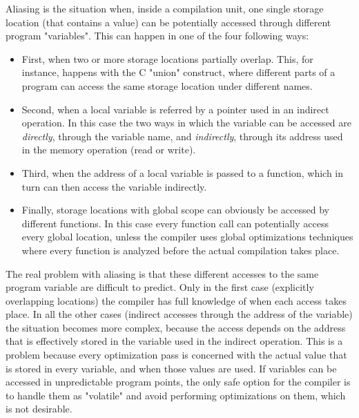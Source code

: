 Aliasing is the situation when, inside a compilation unit, one single storage location (that contains a value) can be potentially accessed through different program "variables".
This can happen in one of the four following ways:
\begin{itemize}
\item First, when two or more storage locations partially overlap. This, for instance, happens with the C "union" construct, where different parts of a program can access the same storage location under different names.
\item Second, when a local variable is referred by a pointer used in an indirect operation. In this case the two ways in which the variable can be accessed are {\em directly}, through the variable name, and {\em indirectly}, through its address used in the memory operation (read or write).
\item Third, when the address of a local variable is passed to a function, which in turn can then access the variable indirectly.
\item Finally, storage locations with global scope can obviously be accessed by different functions. In this case every function call can potentially access every global location, unless the compiler uses global optimizations techniques where every function is analyzed before the actual compilation takes place.
\end{itemize}

The real problem with aliasing is that these different accesses to the same program variable are difficult to predict. Only in the first case (explicitly overlapping locations) the compiler has full knowledge of when each access takes place. In all the other cases (indirect accesses through the address of the variable) the situation becomes more complex, because the access depends on the address that is effectively stored in the variable used in the indirect operation.
This is a problem because every optimization pass is concerned with the actual value that is stored in every variable, and when those values are used. If variables can be accessed in unpredictable program points, the only safe option for the compiler is to handle them as "volatile" and avoid performing optimizations on them, which is not desirable.

